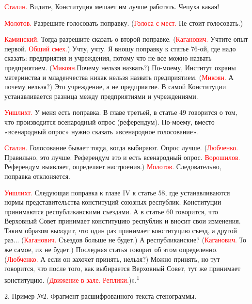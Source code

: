 \documentclass{kursa4}
\begin{document}
{      \textcolor{red}{Сталин.}{
      Видите, Конституция мешает им лучше работать. Чепуха какая!}

      \textcolor{red}{Молотов.}{
      Разрешите голосовать поправку. (}\textcolor{red}{Голоса с мест.}{ Не стоит голосовать.)}

      \textcolor{red}{Каминский.}{
      Тогда разрешите сказать о второй поправке. (}\textcolor{red}{Каганович.}{
      Учтите опыт первой.
      }\textcolor{red}{Общий смех.}{) Учту, учту. Я вношу поправку к статье 76-ой, где надо сказать: предприятия и учреждения, потому что не все можно назвать предприятием. (}\textcolor{red}{Микоян.}{Почему нельзя назвать?) По-моему, Институт охраны материнства и младенчества никак нельзя назвать предприятием. (}\textcolor{red}{Микоян.}{
      А почему нельзя?) Это учреждение, а не предприятие. В самой Конституции устанавливается разница между предприятиями и учреждениями.}

      \textcolor{red}{Уншлихт.}{
      У меня есть поправка. В главе третьей, в статье 49 говорится о том, что производится всенародный опрос (референдум). По-моему, вместо «всенародный опрос» нужно сказать «всенародное голосование».}

      \textcolor{red}{Сталин.}{
      Голосование бывает тогда, когда выбирают. Опрос лучше. (}\textcolor{red}{Любченко.}{
      Правильно, это лучше. Референдум это и есть всенародный опрос.} \textcolor{red}{Ворошилов.} Референдум выявляет, определяет настроения.) \textcolor{red}{Молотов.}{
      Следовательно, поправка отклоняется.}

      \textcolor{red}{Уншлихт.}{
      Следующая поправка к главе IV к статье 58, где устанавливаются нормы представительства конституций союзных республик. Конституции принимаются республиканскими съездами. А в статье 60 говорится, что Верховный Совет принимает конституцию республик и вносит свои изменения. Таким образом выходит, что один раз принимает конституцию съезд, а другой раз... (}\textcolor{red}{Каганович.}{
      Съездов больше не будет.) А республиканские? (}\textcolor{red}{Каганович.}{
      То же самое, их не будет.) Последняя статья говорит об этом определенно. (}\textcolor{red}{Любченко.}{
      А если он захочет принять, нельзя?) Можно принять, но тут говорится, что после того, как выбирается Верховный Совет, тут же принимает конституцию. (}\textcolor{red}{Движение в зале. Реплики.}{)».}{\textsuperscript{1}}


      \bigskip

      2. Пример №2. Фрагмент расшифрованного текста стенограммы. \bigskip

}
\end{document}
